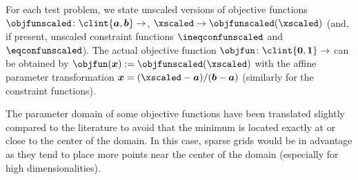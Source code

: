 For each test problem, we state unscaled versions of objective functions
$\objfunscaled\colon \clint{\*a, \*b} \to \real$,
$\xscaled \to \objfunscaled(\xscaled)$
(and, if present, unscaled constraint functions
$\ineqconfunscaled$ and $\eqconfunscaled$).
The actual objective function $\objfun\colon \clint{\*0, \*1} \to \real$
can be obtained by $\objfun(\*x) := \objfunscaled(\xscaled)$
with the affine parameter transformation
$\*x = (\xscaled - \*a)/(\*b - \*a)$
(similarly for the constraint functions).

The parameter domain of some objective functions have been translated slightly
compared to the literature
to avoid that the minimum is located exactly at or close to
the center of the domain.
In this case, sparse grids would be in advantage as
they tend to place more points near the center of the domain
(especially for high dimensionalities).

